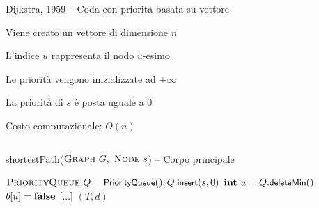 \begin{frame}{Dijkstra, 1959 -- Coda con priorità basata su vettore}

\vspace{-9pt}
\begin{myboxtitle}
\BI
\item Viene creato un vettore di dimensione $n$
\item L'indice $u$ rappresenta il nodo $u$-esimo
\item Le priorità vengono inizializzate ad $+\infty$
\item La priorità di $s$ è posta uguale a $0$
\item Costo computazionale: $O(n)$
\EI
\end{myboxtitle}

\small
\vspace{-18pt}
\begin{columns}
\small
\begin{Procedure}
\caption[A]{\textsf{shortestPath}($\textsc{Graph}\ G,\ \textsc{Node}\ s$) -- Corpo principale}
\alert{$\textsc{PriorityQueue}\ Q = \textsf{{\small PriorityQueue}}(); Q.\textsf{{\small insert}}(s, 0)$}\;
{
  $\INTEGER\ u = Q.\heapdeletemin()$\;
  $b[u] = \FALSE$\;
  {
    {
      [...]
    }
  }
}
\Return $(T,d)$
\end{Procedure}
\end{columns}




\end{frame}



